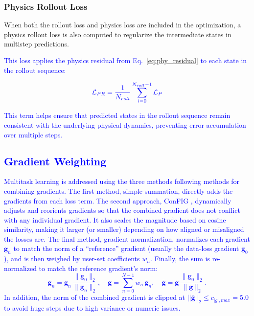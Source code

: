 \documentclass[conference]{IEEEtran}
\begin{document}
\subsubsection{Physics Rollout Loss}
When both the rollout loss and physics loss are included in the optimization, a physics rollout loss is also computed to regularize the intermediate states in multistep predictions. \textcolor{blue}{This loss applies the physics residual from Eq.~\eqref{eq:phy_residual} to each state in the rollout sequence:

\begin{equation}
    \textcolor{blue}{\mathcal{L}_{PR} = \frac{1}{N_{roll}} \sum_{i=0}^{N_{roll}-1} \mathcal{L}_P}
\end{equation}

\textcolor{blue}{This term helps ensure that predicted states in the rollout sequence remain consistent with the underlying physical dynamics, preventing error accumulation over multiple steps.}


\subsection{Gradient Weighting}
\label{sec:grad_weighting}
Multitask learning is addressed using the three methods following methods for combining gradients. The first method, simple summation, directly adds the gradients from each loss term. The second approach, ConFIG \cite{liu_config_2024}, dynamically adjusts and reorients gradients so that the combined gradient does not conflict with any individual gradient. It also scales the magnitude based on cosine similarity, making it larger (or smaller) depending on how aligned or misaligned the losses are. The final method, gradient normalization, normalizes each gradient $\mathbf{g}_n$ to match the norm of a “reference” gradient (usually the data-loss gradient $\mathbf{g}_0$), and is then weighed by user-set coefficients $w_n$. Finally, the sum is re-normalized to match the reference gradient’s norm:
    \begin{equation}
    \label{eq:grad_norm_scaling}
        \bar{\mathbf{g}}_n
        =
        \mathbf{g}_n\,
        \frac{\|\mathbf{g}_0\|_2}{\|\mathbf{g}_n\|_2},
        \quad
        \mathbf{g}
        =
        \sum_{n=0}^{N-1} w_n\,\bar{\mathbf{g}}_n,
        \quad
        \bar{\mathbf{g}}
        =
        \mathbf{g}\,
        \frac{\|\mathbf{g}_0\|_2}{\|\mathbf{g}\|_2}.
    \end{equation}
In addition, the norm of the combined gradient is clipped at $||\bar{\mathbf{g}}||_2\leq c_{|g|,max}=5.0$ to avoid huge steps due to high variance or numeric issues.

}
\end{document}
